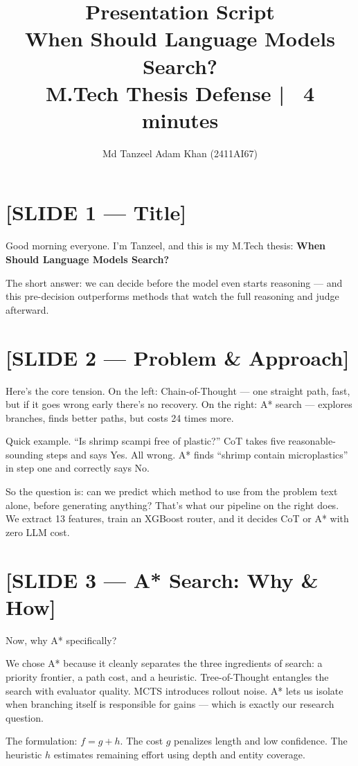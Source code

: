\documentclass[11pt]{article}
\title{\Large\textbf{Presentation Script}\\[0.3em]\normalsize When Should Language Models Search?\\M.Tech Thesis Defense | ~4 minutes}
\author{Md Tanzeel Adam Khan (2411AI67)}
\date{}
\begin{document}
\maketitle
\thispagestyle{empty}

\section{[SLIDE 1 --- Title]}

Good morning everyone. I'm Tanzeel, and this is my M.Tech thesis: \textbf{When Should Language Models Search?}

The short answer: we can decide before the model even starts reasoning --- and this pre-decision outperforms methods that watch the full reasoning and judge afterward.

\section{[SLIDE 2 --- Problem \& Approach]}

Here's the core tension. On the left: Chain-of-Thought --- one straight path, fast, but if it goes wrong early there's no recovery. On the right: A* search --- explores branches, finds better paths, but costs 24 times more.

Quick example. ``Is shrimp scampi free of plastic?'' CoT takes five reasonable-sounding steps and says Yes. All wrong. A* finds ``shrimp contain microplastics'' in step one and correctly says No.

So the question is: can we predict which method to use from the problem text alone, before generating anything? That's what our pipeline on the right does. We extract 13 features, train an XGBoost router, and it decides CoT or A* with zero LLM cost.

\section{[SLIDE 3 --- A* Search: Why \& How]}

Now, why A* specifically?

We chose A* because it cleanly separates the three ingredients of search: a priority frontier, a path cost, and a heuristic. Tree-of-Thought entangles the search with evaluator quality. MCTS introduces rollout noise. A* lets us isolate when branching itself is responsible for gains --- which is exactly our research question.

The formulation: $f = g + h$. The cost $g$ penalizes length and low confidence. The heuristic $h$ estimates remaining effort using depth and entity coverage.
\end{document}
